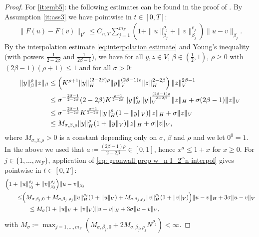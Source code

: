 \documentclass{amsart}
\newcommand{\<}{\langle}
\newcommand{\?}{\rangle}
\theoremstyle{plain}
\theoremstyle{remark}
\theoremstyle{plain}
\numberwithin{equation}{section}
\begin{document}
\begin{proof}
For \ref{it:emb5}: the following estimates can be found in the proof of \cite[Prop. 4.5]{AV22variational}.
By Assumption \ref{it:ass3} we have pointwise in $t\in[0,T]$:
\begin{align}\label{eq: gronwall prep w_n I_2^n f_n}
\|F(u)-F(v) \|_{V^*}\leq C_{n,T}\sum_{j=1}^{m_F}\left(1+\|u\|_{\beta_j}^{\rho_j}+\|v\|_{\beta_j}^{\rho_j}\right)\|u-v\|_{\beta_j}.
\end{align}
By the interpolation estimate \eqref{eq:interpolation estimate} and Young's inequality (with powers $\frac{1}{2-2\beta}$ and $\frac{1}{2\beta-1}$), we have for all $y,z\in V$, $\beta\in(\frac{1}{2},1)$, $\rho\geq0$ with $(2\beta-1)(\rho+1)\leq 1$ and for all $\sigma>0$:
\begin{align}\label{eq: gronwall prep w_n I_2^n interpol}
  \|y\|_{\beta}^{\rho}\|z\|_\beta &\leq \left(K^{\rho+1}\|y\|_H^{(2-2\beta)\rho}\|y\|_V^{(2\beta-1)\rho}\|z\|_H^{2-2\beta}\right)\|z\|_V^{2\beta-1}\notag \\
 &\leq \sigma^{-\frac{2\beta-1}{2-2\beta}}(2-2\beta) K^{\frac{\rho+1}{2-2\beta}}\|y\|_H^{\rho}\|y\|_V^{\frac{(2\beta-1)\rho}{2-2\beta}}\|z\|_H+\sigma(2\beta-1)\|z\|_V \notag\\
 &\leq \sigma^{-\frac{2\beta-1}{2-2\beta}} K^{\frac{\rho+1}{2-2\beta}}\|y\|_H^{\rho}(1+\|y\|_V)\|z\|_H+\sigma\|z\|_V \notag\\
 &\leq M_{\sigma,\beta,\rho} \|y\|_H^{\rho}(1+\|y\|_V)\|z\|_H+\sigma\|z\|_V,
\end{align}
where $M_{\sigma,\beta,\rho}> 0$ is a constant depending only on $\sigma$, $\beta$ and $\rho$ and we let $0^0=1$. In the above we used that $a\coloneqq \frac{(2\beta-1)\rho}{2-2\beta} \in[0,1]$, hence $x^a\leq 1+x$ for $x\geq 0$.
For $j\in\{1,\ldots,m_F\}$, application of \eqref{eq: gronwall prep w_n I_2^n interpol} gives pointwise in $t\in[0,T]$:
\begin{align}\label{eq: gronwall prep w_n I_2^n f_n second ter,eq: gronwall prep w_n I_2^n f_n second term}
\Big(1+\|&u\|_{\beta_j}^{\rho_j}+\|v\|_{\beta_j}^{\rho_j}\Big)\|u-v\|_{\beta_j}\notag\\
\leq &\Big(M_{\sigma,\beta_j,0}+M_{\sigma,\beta_j,\rho_j}\|u\|_{H}^{\rho_j}(1+\|u\|_V) +M_{\sigma,\beta_j,\rho_j}\|v\|_{H}^{\rho_j}(1+\|v\|_V)\Big)\|u-v\|_{H}+3\sigma\|u-v\|_V\notag\\
&\quad\leq M_{\sigma}(1+\|u\|_V+\|v\|_V)\|u-v\|_{H}+3\sigma\|u-v\|_V,
\end{align}
with $M_\sigma\coloneqq \max_{j=1,\ldots, m_F}(M_{\sigma,\beta_j,0}+2M_{\sigma,\beta_j,\rho_j}N^{\rho_j})<\infty$.

\end{proof}
\end{document}
